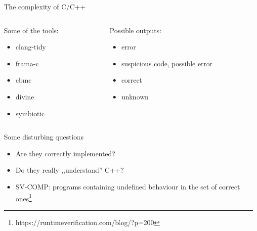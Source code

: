 \documentclass[11pt]{beamer}
\begin{document}
\begin{frame}{The complexity of C/C++}
\begin{columns}

\begin{column}{0.5\textwidth}
Some of the tools:
\begin{itemize}
\pause \item clang-tidy
\pause \item frama-c
\pause \item cbmc
\pause \item divine
\pause \item symbiotic
\end{itemize}
\end{column}

\begin{column}{0.5\textwidth}
\pause
Possible outputs:
\begin{itemize}
\pause \item error
\pause \item suspicious code, possible error
\pause \item correct
\pause \item unknown
\end{itemize}
\end{column}

\end{columns}
\end{frame}


\begin{frame}{Some disturbing questions}

\begin{itemize}
\pause \item Are they correctly implemented?
\pause \item Do they really ,,understand'' C++?
\pause \item SV-COMP: programs containing undefined behaviour in the set of correct ones\footnote[frame]{https://runtimeverification.com/blog/?p=200}
\end{itemize}

\end{frame}
\end{document}
